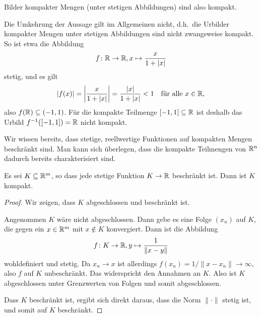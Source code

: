 \documentclass[a4paper,10pt]{article}
\begin{document}
Bilder kompakter Mengen (unter stetigen Abbildungen) sind also kompakt.


\begin{bem}
 Die Umkehrung der Aussage gilt im Allgemeinen nicht, d.h.\ die Urbilder kompakter Mengen unter stetigen Abbildungen sind nicht zwangsweise kompakt. So ist etwa die Abbildung
 \[
  f \colon \mathbb{R} \to \mathbb{R}, x \mapsto \frac{x}{1+|x|}
 \]
 stetig, und es gilt
 \[
  |f(x)|
  = \left| \frac{x}{1+|x|} \right|
  = \frac{|x|}{1+|x|}
  < 1
  \quad
  \text{für alle $x \in \mathbb{R}$},
 \]
 also $f(\mathbb{R}) \subseteq (-1,1)$. Für die kompakte Teilmenge $[-1,1] \subseteq \mathbb{R}$ ist deshalb das Urbild $f^{-1}([-1,1]) = \mathbb{R}$ nicht kompakt.
\end{bem}


Wir wissen bereits, dass stetige, reellwertige Funktionen auf kompakten Mengen beschränkt sind. Man kann sich überlegen, dass die kompakte Teilmengen von $\mathbb{R}^n$ dadurch bereits charakterisiert sind.


\begin{lem}
 Es sei $K \subseteq \mathbb{R}^m$, so dass jede stetige Funktion $K \to \mathbb{R}$ beschränkt ist. Dann ist $K$ kompakt.
\end{lem}
\begin{proof}
 Wir zeigen, dass $K$ abgeschlossen und beschränkt ist.
 
 Angenommen $K$ wäre nicht abgeschlossen. Dann gebe es eine Folge $(x_n)$ auf $K$, die gegen ein $x \in \mathbb{R}^m$ mit $x \notin K$ konvergiert. Dann ist die Abbildung
 \[
  f \colon K \to \mathbb{R}, y \mapsto \frac{1}{\|x-y\|}
 \]
 wohldefiniert und stetig. Da $x_n \to x$ ist allerdings $f(x_n) = 1/\|x-x_n\| \to \infty$, also $f$ auf $K$ unbeschränkt. Das widerspricht den Annahmen an $K$. Also ist $K$ abgeschlossen unter Grenzwerten von Folgen und somit abgeschlossen.
 
 Dass $K$ beschränkt ist, ergibt sich direkt daraus, dass die Norm $\|\cdot\|$ stetig ist, und somit auf $K$ beschränkt.
\end{proof}
\end{document}
